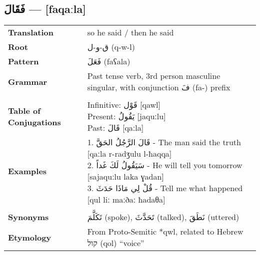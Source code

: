 \documentclass[letter,12pt]{article}
\begin{document}
\subsection{\textarabic{فَقَالَ} — [faqaːla]}
\begin{tabular}{p{3cm}p{10cm}}
\toprule
\textbf{Translation} & so he said / then he said \\
\textbf{Root} & \textarabic{ق-و-ل} (q-w-l) \\
\textbf{Pattern} & \textarabic{فَعَلَ} (faʕala) \\
\textbf{Grammar} & Past tense verb, 3rd person masculine singular, with conjunction \textarabic{فَ} (fa-) prefix \\
\midrule \\
\textbf{Table of Conjugations} &  \makecell[l]{
Infinitive: \textarabic{قَوْل} [qawl] \\
Present: \textarabic{يَقُولُ} [jaquːlu] \\
Past: \textarabic{قَالَ} [qaːla]
} \\
\midrule
\textbf{Examples} & \makecell[l]{\parbox{9.5cm}{
1. \textarabic{قَالَ الرَّجُلُ الحَقَّ} - The man said the truth [qaːla r-radʒulu l-ħaqqa]\\
2. \textarabic{سَيَقُولُ لَكَ غَداً} - He will tell you tomorrow [sajaquːlu laka ɣadan]\\
3. \textarabic{قُلْ لِي مَاذَا حَدَثَ} - Tell me what happened [qul liː maːðaː ħadaθa]
} } \\
\midrule \\
\textbf{Synonyms} & \textarabic{تَكَلَّمَ} (spoke), \textarabic{تَحَدَّثَ} (talked), \textarabic{نَطَقَ} (uttered) \\
\textbf{Etymology} & From Proto-Semitic *qwl, related to Hebrew \texthebrew{קול} (qol) ``voice'' \\
\bottomrule
\end{tabular}

\end{document}
